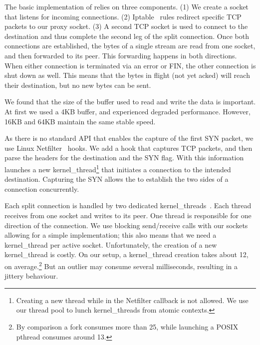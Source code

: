  The basic implementation of \ksplit relies on three components. (1) We create a socket that listens for incoming connections. (2) Iptable~\cite{iptables} rules redirect specific TCP packets to our proxy socket. (3) A second TCP socket is used to connect to the destination and thus complete the second leg of the split connection. Once both connections are established, the bytes of a single stream are read from one socket, and then forwarded to its peer. This forwarding happens in both directions. When either connection is terminated via an error or FIN, the other connection is shut down as well. This means that the bytes in flight (\ie not yet acked) will reach their destination, but no new bytes can be sent.

 We found that the size of the buffer used to read and write the data is important. At first we used  a 4KB buffer, and experienced degraded performance. However, 16KB and 64KB maintain the same stable speed.

As there is no standard API that enables the capture of the first SYN packet, we use Linux Netfilter~\cite{netfilter} hooks. We add a hook that captures TCP packets, and then parse the headers for the destination and the SYN flag. With this information \ksplit launches a new kernel\_thread\footnote{Creating a new thread while in the Netfilter callback is not allowed. We use our thread pool to lunch kernel\_threads from atomic contexts.} that initiates a connection to the intended destination. Capturing the SYN allows the \proxies to establish the two sides of a connection concurrently.

Each split connection is handled by two dedicated kernel\_threads~\cite{kthread}. Each thread receives from one socket and writes to its peer. One thread is responsible for one direction of the connection. We use blocking send/receive calls with our sockets allowing for a simple implementation; this also means that we need a kernel\_thread per active socket. Unfortunately, the creation of a new kernel\_thread is costly. On our setup, a kernel\_thread creation takes about 12\usec, on average.\footnote{By comparison a fork consumes more than 25\usec , while launching a POSIX pthread consumes around 13\usec.} But an outlier may consume several milliseconds, resulting in a jittery behaviour.

